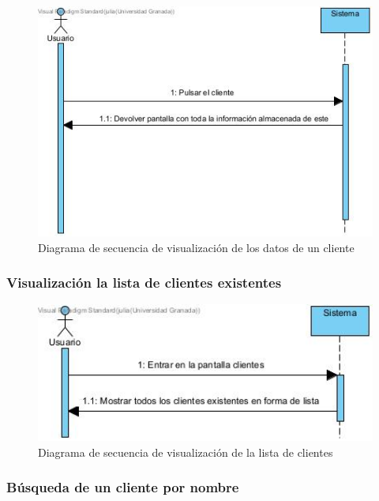 \begin{figure}[H]
	\centering
	\includegraphics[width=1\textwidth]{imagenes/imagenesDiagramas/Cliente/visualizarDatosCliente.jpg}
	\caption{Diagrama de secuencia de visualización de los datos de un cliente}
	\label{fig:seqdiag15}
\end{figure}

\subsubsection{Visualización la lista de clientes existentes}

\begin{figure}[H]
	\centering
	\includegraphics[width=1\textwidth]{imagenes/imagenesDiagramas/Cliente/visualizarListaClientes.jpg}
	\caption{Diagrama de secuencia de visualización de la lista de clientes}
	\label{fig:seqdiag16}
\end{figure}

\subsubsection{Búsqueda de un cliente por nombre}

